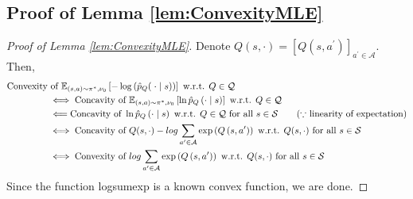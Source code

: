\fi


\subsection{Proof of Lemma \ref{lem:ConvexityMLE}}
\begin{proof}[Proof of Lemma \ref{lem:ConvexityMLE}] \label{sec:NLLproperties}
Denote $Q(s, \cdot)=\left[Q\left(s, a^{\prime}\right)\right]_{a^{\prime} \in \mathcal{A}}$. Then,
\begin{align}
    \text{Convexity}& \text{ of }  \mathbb{E}_{(s, a)\sim \pi^*, \nu_0}  \left[-\log\left(\hat{p}_{Q}(\;\cdot
    \mid s)\right)\right] \text{ w.r.t. }Q\in\mathcal{Q}\notag
    \\
    &\iff \text{Concavity of } \mathbb{E}_{(s,a)\sim\pi^*, \nu_0}\left[\ln \hat{p}_{Q}\left( \cdot \mid s\right)\right] \text{ w.r.t. } Q\in\mathcal{Q} \notag
    \\
    &\;\Longleftarrow \text{Concavity of } \ln \hat{p}_{Q}\left(\cdot \mid s\right)\text{ w.r.t. } Q\in\mathcal{Q} \text{ for all } s\in\mathcal{S} \tag{$\because$ linearity of expectation}
    \\
    &\iff \text{Concavity of }  Q(s, \cdot)-log \sum_{a^{\prime}\in\mathcal{A}} \exp \left(Q\left(s, a^{\prime}\right)\right) \text{ w.r.t. } Q(s, \cdot)  \text{ for all } s\in\mathcal{S} \notag
    \\
    &\iff \text{Convexity of } log \sum_{a^{\prime}\in\mathcal{A}} \exp \left(Q\left(s, a^{\prime}\right)\right) \text{ w.r.t. } Q(s, \cdot)  \text{ for all } s\in\mathcal{S}  \notag
\end{align}
Since the function logsumexp is a known convex function, we are done.


\end{proof}
